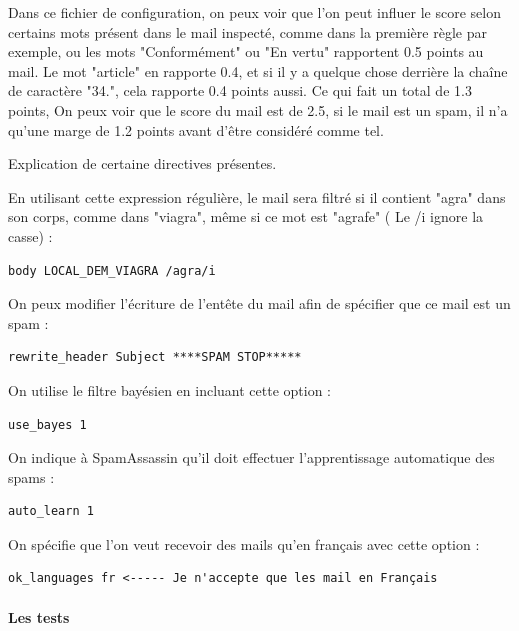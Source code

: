 \documentclass[a4paper,11pt]{article}
\begin{document}
Dans ce fichier de configuration, on peux voir que l'on peut influer le score selon certains mots présent dans le mail inspecté, comme dans la première règle par exemple, ou les mots "Conformément" ou "En vertu" rapportent 0.5 points au mail. Le mot "article" en rapporte 0.4, et si il y a quelque chose derrière la chaîne de caractère "34.", cela rapporte 0.4 points aussi. Ce qui fait un total de 1.3 points, On peux voir que le score du mail est de 2.5, si le mail est un spam, il n'a qu'une marge de 1.2 points avant d'être considéré comme tel.

Explication de certaine directives présentes. 

En utilisant cette expression régulière, le mail sera filtré si il contient "agra" dans son corps, comme dans "viagra", même si ce mot est "agrafe" ( Le /i ignore la casse) :
\begin{lstlisting}
body LOCAL_DEM_VIAGRA /agra/i  
\end{lstlisting}

On peux modifier l'écriture de l'entête du mail afin de spécifier que ce mail est un spam :
\begin{lstlisting}
rewrite_header Subject ****SPAM STOP*****
\end{lstlisting}

On utilise le filtre bayésien en incluant cette option : 
\begin{lstlisting}
use_bayes 1
\end{lstlisting}

On indique à SpamAssassin qu'il doit effectuer l'apprentissage automatique des spams :

\begin{lstlisting}
auto_learn 1
\end{lstlisting}

On spécifie que l'on veut recevoir des mails qu'en français avec cette option :

\begin{lstlisting}
ok_languages fr <----- Je n'accepte que les mail en Français
\end{lstlisting}

\paragraph{Les tests}
\end{document}
